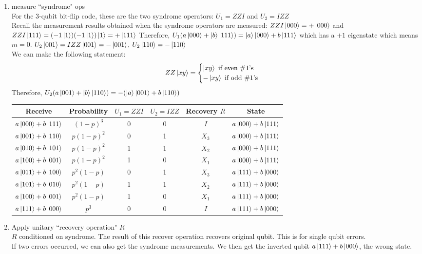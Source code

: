 \begin{enumerate}
    \item measure ``syndrome" ops\\
    For the 3-qubit bit-flip code, these are the two syndrome operators: $U_1 = ZZI$ and $U_2 = IZZ$ \\
    Recall the measurement results obtained when the syndrome operators are measured: $ZZI\ket{000} = + \ket{000}$ and $ZZI\ket{111} = (-1 \ket{1})(-1\ket{1})\ket{1}= + \ket{111}$ Therefore, $U_1(a\ket{000} + \ket{b}\ket{111}) = \ket{a}\ket{000} + b\ket{111}$ which has a $+1$ eigenstate which means $m=0$. $U_2\ket{001} = IZZ \ket{001} = -\ket{001}$, $U_2\ket{110} = -\ket{110}$ \\
    We can make the following statement:
    \begin{equation}
        ZZ\ket{xy} = \begin{cases}
            \ket{xy} \text{ if even \#1's} \\
            -\ket{xy} \text{ if odd \#1's} \\
        \end{cases}
    \end{equation}
    Therefore, $U_2(a\ket{001} + \ket{b}\ket{110}) =  -(\ket{a}\ket{001} + b\ket{110})$

\begin{center}
    \begin{tabular}{ c | c | c | c | c | c}
    Receive & Probability & $U_1=ZZI$ & $U_2=IZZ$ & Recovery $R$ & State\\
    \hline
    $a\ket{000} + b\ket{111}$ & $(1 -p)^3$ & 0 & 0 & $I$ & $a\ket{000} + b\ket{111}$\\  
    $a\ket{001} + b\ket{110}$ & $p(1-p)^2$ & 0 & 1 & $X_3$ &$ a\ket{000} + b\ket{111}$\\ 
    $a\ket{010} + b\ket{101}$ & $p(1-p)^2$ & 1 & 1 & $X_2$ & $a\ket{000} + b\ket{111}$\\
    $a\ket{100} + b\ket{001}$ & $p(1-p)^2$ & 1 & 0 & $X_1$ & $a\ket{000} + b\ket{111}$ \\
    $a\ket{011} + b\ket{100}$ & $p^2(1-p)$ & 0 & 1 & $X_3$ & $a\ket{111} + b\ket{000}$\\
    $a\ket{101} + b\ket{010}$ & $p^2(1-p)$ & 1 & 1 & $X_2$ & $a\ket{111} + b\ket{000}$\\
    $a\ket{100} + b\ket{001}$ & $p^2(1-p)$ & 1 & 0 & $X_1$ & $a\ket{111} + b\ket{000}$\\
    $a\ket{111} + b\ket{000}$ & $p^3$ & 0 & 0 & $I$ & $a\ket{111} + b\ket{000}$
    \end{tabular}
\end{center}
\item Apply unitary ``recovery operation" $R$\\ 
$R$ conditioned on syndrome. The result of this recover operation recovers original qubit. This is for single qubit errors. \\

If two errors occurred, we can also get the syndrome measurements. We then get the inverted qubit
$a\ket{111} + b\ket{000}$, the wrong state. \\
    
\end{enumerate}

